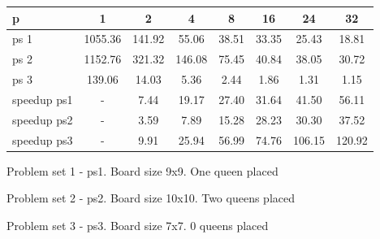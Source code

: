 \documentclass[12pt]{article}
\begin{document}
\begin{center}
  \begin{tabular}{ | l | c | c | c | c | c | c | c | }
    \hline
    p & 1 & 2 & 4 & 8 & 16 & 24 & 32  \\ \hline
    ps 1 & 1055.36 & 141.92 & 55.06 & 38.51 & 33.35 & 25.43 & 18.81  \\
    ps 2 & 1152.76 & 321.32 & 146.08 & 75.45 & 40.84 & 38.05 & 30.72  \\
    ps 3 & 139.06 & 14.03 & 5.36 & 2.44 & 1.86 & 1.31 & 1.15  \\ \hline
    speedup ps1 & - & 7.44 & 19.17 & 27.40 & 31.64 & 41.50 & 56.11 \\
    speedup ps2 & - & 3.59 & 7.89 & 15.28 & 28.23 & 30.30 & 37.52 \\
    speedup ps3 & - & 9.91 & 25.94 & 56.99 & 74.76 & 106.15 & 120.92 \\
    \hline
  \end{tabular}
\end{center}

Problem set 1 - ps1.   Board size 9x9. One queen placed

Problem set 2 - ps2.   Board size 10x10. Two queens placed 

Problem set 3 - ps3.   Board size 7x7. 0 queens placed 


\clearpage
\end{document}
